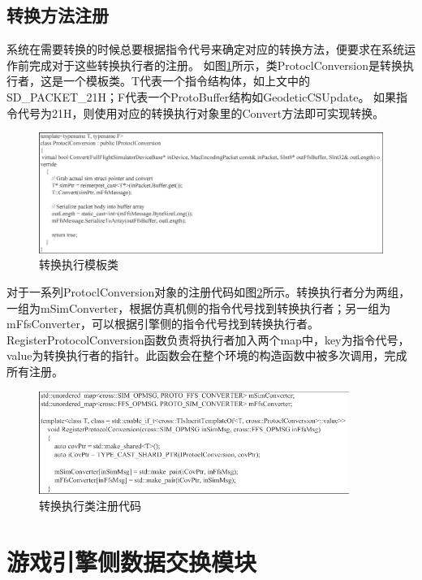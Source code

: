 \subsection{转换方法注册}
系统在需要转换的时候总要根据指令代号来确定对应的转换方法，便要求在系统运作前完成对于这些转换执行者的注册。
如图\ref{convtmp}所示，类ProtoclConversion是转换执行者，这是一个模板类。T代表一个指令结构体，如上文中的SD\_PACKET\_21H；F代表一个ProtoBuffer结构如GeodeticCSUpdate。
如果指令代号为21H，则使用对应的转换执行对象里的Convert方法即可实现转换。
\begin{figure}[h!]
    \begin{center}
        \includegraphics[width=\textwidth]{pictures/code13.pdf}
        \caption{转换执行模板类}
        \label{convtmp}
    \end{center}
\end{figure}
\par
对于一系列ProtoclConversion对象的注册代码如图\ref{regiconv}所示。转换执行者分为两组，一组为mSimConverter，根据仿真机侧的指令代号找到转换执行者；另一组为mFfsConverter，可以根据引擎侧的指令代号找到转换执行者。
RegisterProtocolConversion函数负责将执行者加入两个map中，key为指令代号，value为转换执行者的指针。此函数会在整个环境的构造函数中被多次调用，完成所有注册。
\begin{figure}[h!]
    \begin{center}
        \includegraphics[width=0.9\textwidth]{pictures/code14.pdf}
        \caption{转换执行类注册代码}
        \label{regiconv}
    \end{center}
\end{figure}
\section{游戏引擎侧数据交换模块}
